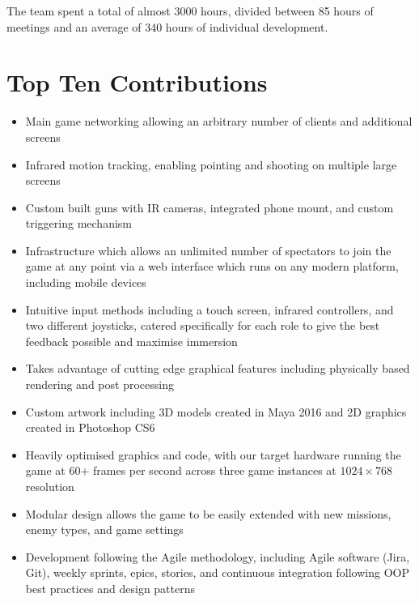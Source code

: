 \documentclass[a4paper,11pt]{article}
\begin{document}
\vspace{1em}

The team spent a total of almost 3000 hours, divided between 85 hours of meetings and an average of 340 hours of individual development.

\clearpage

\section{Top Ten Contributions}

\begin{itemize}
  \large

  \item Main game networking allowing an arbitrary number of clients and additional screens
  \item Infrared motion tracking, enabling pointing and shooting on multiple large screens
  \item Custom built guns with IR cameras, integrated phone mount, and custom triggering mechanism
  \item Infrastructure which allows an unlimited number of spectators to join the game at any point via a web interface which runs on any modern platform, including mobile devices
  \item Intuitive input methods including a touch screen, infrared controllers, and two different joysticks, catered specifically for each role to give the best feedback possible and maximise immersion 
  \item Takes advantage of cutting edge graphical features including physically based rendering and post processing
  \item Custom artwork including 3D models created in Maya 2016 and 2D graphics created in Photoshop CS6
  \item Heavily optimised graphics and code, with our target hardware running the game at 60+ frames per second across three game instances at $1024 \times 768$ resolution
    \item Modular design allows the game to be easily extended with new missions, enemy types, and game settings
  \item Development following the Agile methodology, including Agile software (Jira, Git), weekly sprints, epics, stories, and continuous integration following OOP best practices and design patterns
\end{itemize}
\end{document}
